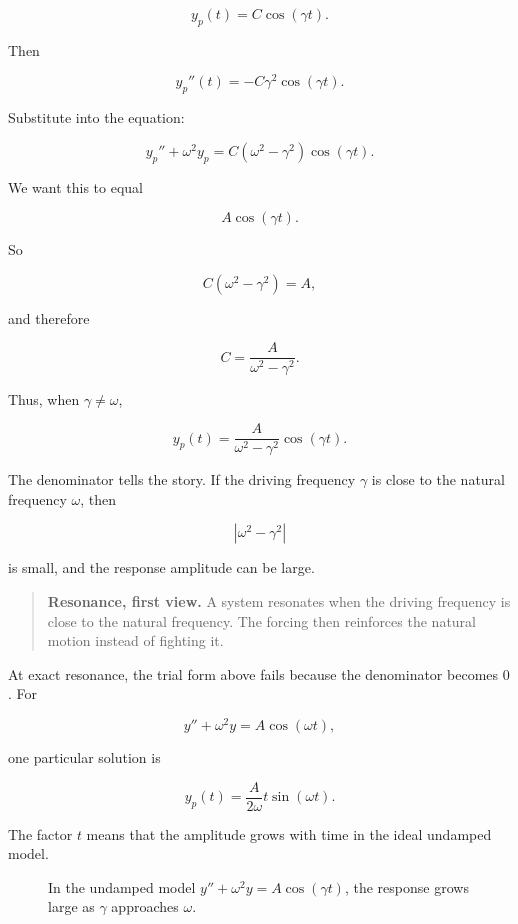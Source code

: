 \[
y_p(t)=C\cos(\gamma t).
\]

Then

\[
y_p''(t)=-C\gamma^2\cos(\gamma t).
\]

Substitute into the equation:

\[
y_p''+\omega^2y_p
=
C(\omega^2-\gamma^2)\cos(\gamma t).
\]

We want this to equal

\[
A\cos(\gamma t).
\]

So

\[
C(\omega^2-\gamma^2)=A,
\]

and therefore

\[
\boxed{
C=\frac{A}{\omega^2-\gamma^2}.
}
\]

Thus, when \(\gamma\neq\omega\),

\[
\boxed{
y_p(t)=\frac{A}{\omega^2-\gamma^2}\cos(\gamma t).
}
\]

The denominator tells the story.  If the driving frequency \(\gamma\) is close to the
natural frequency \(\omega\), then

\[
|\omega^2-\gamma^2|
\]

is small, and the response amplitude can be large.

\begin{quote}
\textbf{Resonance, first view.}
A system resonates when the driving frequency is close to the natural frequency.  The
forcing then reinforces the natural motion instead of fighting it.
\end{quote}

At exact resonance, the trial form above fails because the denominator becomes \(0\).
For

\[
y''+\omega^2y=A\cos(\omega t),
\]

one particular solution is

\[
\boxed{
y_p(t)=\frac{A}{2\omega}t\sin(\omega t).
}
\]

The factor \(t\) means that the amplitude grows with time in the ideal undamped model.

\begin{figure}[h]
\centering
{}
\caption{In the undamped model \(y''+\omega^2y=A\cos(\gamma t)\), the response grows large as \(\gamma\) approaches \(\omega\).}
\label{fig:resonance-response}
\end{figure}

